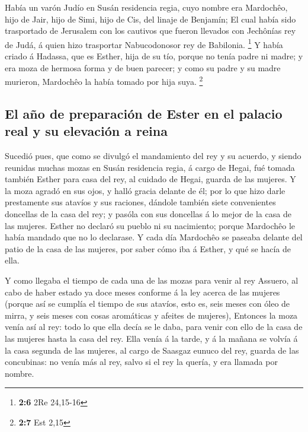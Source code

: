 Había un varón Judío en Susán residencia regia, cuyo nombre
era Mardochêo, hijo de Jair, hijo de Simi, hijo de Cis, del linaje de
Benjamín;  El cual había sido trasportado de Jerusalem con
los cautivos que fueron llevados con Jechônías rey de Judá, á quien hizo
trasportar Nabucodonosor rey de Babilonia. \footnote{\textbf{2:6} 2Re
  24,15-16}  Y había criado á Hadassa, que es Esther, hija
de su tío, porque no tenía padre ni madre; y era moza de hermosa forma y
de buen parecer; y como su padre y su madre murieron, Mardochêo la había
tomado por hija suya. \footnote{\textbf{2:7} Est 2,15}

\hypertarget{el-auxf1o-de-preparaciuxf3n-de-ester-en-el-palacio-real-y-su-elevaciuxf3n-a-reina}{%
\subsection{El año de preparación de Ester en el palacio real y su
elevación a
reina}\label{el-auxf1o-de-preparaciuxf3n-de-ester-en-el-palacio-real-y-su-elevaciuxf3n-a-reina}}

 Sucedió pues, que como se divulgó el mandamiento del rey y
su acuerdo, y siendo reunidas muchas mozas en Susán residencia regia, á
cargo de Hegai, fué tomada también Esther para casa del rey, al cuidado
de Hegai, guarda de las mujeres.  Y la moza agradó en sus
ojos, y halló gracia delante de él; por lo que hizo darle prestamente
sus atavíos y sus raciones, dándole también siete convenientes doncellas
de la casa del rey; y pasóla con sus doncellas á lo mejor de la casa de
las mujeres.  Esther no declaró su pueblo ni su nacimiento;
porque Mardochêo le había mandado que no lo declarase.  Y
cada día Mardochêo se paseaba delante del patio de la casa de las
mujeres, por saber cómo iba á Esther, y qué se hacía de ella.

 Y como llegaba el tiempo de cada una de las mozas para
venir al rey Assuero, al cabo de haber estado ya doce meses conforme á
la ley acerca de las mujeres (porque así se cumplía el tiempo de sus
atavíos, esto es, seis meses con óleo de mirra, y seis meses con cosas
aromáticas y afeites de mujeres),  Entonces la moza venía
así al rey: todo lo que ella decía se le daba, para venir con ello de la
casa de las mujeres hasta la casa del rey.  Ella venía á la
tarde, y á la mañana se volvía á la casa segunda de las mujeres, al
cargo de Saasgaz eunuco del rey, guarda de las concubinas: no venía más
al rey, salvo si el rey la quería, y era llamada por nombre.

